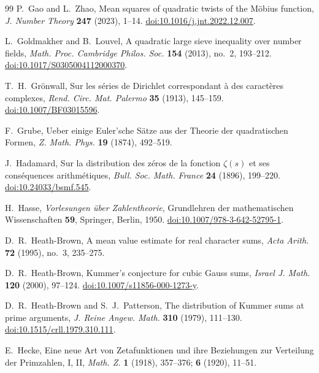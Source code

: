 \begin{thebibliography}{99}
P.~Gao and L.~Zhao,
Mean squares of quadratic twists of the M\"obius function,
\emph{J. Number Theory} \textbf{247} (2023), 1--14.
\href{https://doi.org/10.1016/j.jnt.2022.12.007}
{doi:10.1016/j.jnt.2022.12.007}.

L.~Goldmakher and B.~Louvel,
A quadratic large sieve inequality over number fields,
\emph{Math. Proc. Cambridge Philos. Soc.} \textbf{154} (2013),
no.~2, 193--212.
\href{https://doi.org/10.1017/S0305004112000370}
{doi:10.1017/S0305004112000370}.

T.~H.~Gr\"onwall,
Sur les s\'eries de Dirichlet correspondant \`a des caract\`eres complexes,
\emph{Rend. Circ. Mat. Palermo} \textbf{35} (1913), 145--159.
\href{https://doi.org/10.1007/BF03015596}{doi:10.1007/BF03015596}.

F.~Grube,
Ueber einige Euler'sche S\"atze aus der Theorie der quadratischen Formen,
\emph{Z. Math. Phys.} \textbf{19} (1874), 492--519.

J.~Hadamard,
Sur la distribution des z\'eros de la fonction $\zeta(s)$ et ses
cons\'equences arithm\'etiques,
\emph{Bull. Soc. Math. France} \textbf{24} (1896), 199--220.
\href{https://doi.org/10.24033/bsmf.545}{doi:10.24033/bsmf.545}.

{\raggedright
H.~Hasse,
\emph{Vorlesungen \"uber Zahlentheorie},
Grundlehren der mathematischen Wissenschaften \textbf{59},
Springer, Berlin, 1950.
\href{https://doi.org/10.1007/978-3-642-52795-1}
{doi:10.1007/978-3-642-52795-1}.
\par}

D.~R.~Heath-Brown,
A mean value estimate for real character sums,
\emph{Acta Arith.} \textbf{72} (1995), no.~3, 235--275.

D.~R.~Heath-Brown,
Kummer's conjecture for cubic Gauss sums,
\emph{Israel J. Math.} \textbf{120} (2000), 97--124.
\href{https://doi.org/10.1007/s11856-000-1273-y}
{doi:10.1007/s11856-000-1273-y}.

D.~R.~Heath-Brown and S.~J.~Patterson,
The distribution of Kummer sums at prime arguments,
\emph{J. Reine Angew. Math.} \textbf{310} (1979), 111--130.
\href{https://doi.org/10.1515/crll.1979.310.111}
{doi:10.1515/crll.1979.310.111}.

E.~Hecke,
Eine neue Art von Zetafunktionen und ihre Beziehungen zur Verteilung
der Primzahlen, I, II,
\emph{Math. Z.} \textbf{1} (1918), 357--376;
\textbf{6} (1920), 11--51.


\end{thebibliography}
